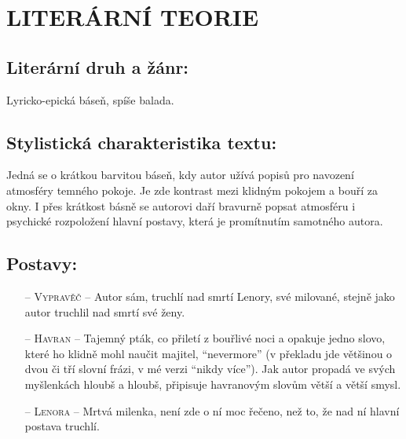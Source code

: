 \documentclass[A4paper]{extarticle} %
\begin{document}
\section*{LITERÁRNÍ TEORIE}

\subsection*{Literární druh a žánr:}
\noindent 
Lyricko-epická báseň, spíše balada.





\subsection*{Stylistická charakteristika textu:}
\noindent 
Jedná se o krátkou barvitou báseň, kdy autor užívá popisů pro navození atmosféry temného pokoje. Je zde kontrast mezi klidným pokojem a bouří za okny. I přes krátkost básně se autorovi daří bravurně popsat atmosféru i psychické rozpoložení hlavní postavy, která je promítnutím samotného autora.

\subsection*{Postavy:} 
\noindent
\begin{itemize}
    \item [--] \textsc{Vypravěč} -- Autor sám, truchlí nad smrtí Lenory, své milované, stejně jako autor truchlil nad smrtí své ženy. 
    \item [--] \textsc{Havran} -- Tajemný pták, co přiletí z bouřlivé noci a opakuje jedno slovo, které ho klidně mohl naučit majitel, \enquote{nevermore} (v překladu jde většinou o dvou či tří slovní frázi, v mé verzi \enquote{nikdy více}). Jak autor propadá ve svých myšlenkách hloubš a hloubš, připisuje havranovým slovům větší a větší smysl.
    \item [--] \textsc{Lenora} -- Mrtvá milenka, není zde o ní moc řečeno, než to, že nad ní hlavní postava truchlí.
\end{itemize}
\end{document}
